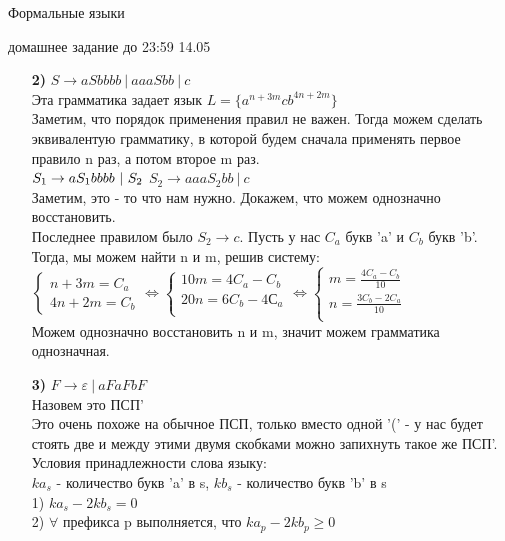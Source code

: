 \documentclass[12pt]{article}
\begin{document}
\begin{center} {\LARGE Формальные языки} \end{center}

\begin{center} \Large домашнее задание до 23:59 14.05 \end{center}
\bigskip

\begin{enumerate}
  \item[\bf 2)] $S \to aSbbbb\ |\ aaaSbb\ |\ c$\\
  Эта грамматика задает язык $L = \{a^{n + 3m}cb^{4n+2m}\}$\\
  Заметим, что порядок применения правил не важен. Тогда можем сделать эквивалентую грамматику, в которой будем сначала применять первое правило n раз, а потом второе m раз.\\
  $S_1 \to aS_1bbbb\ |\ S_2\\$
  $S_2 \to aaaS_2bb\ |\ c$\\
  Заметим, это - то что нам нужно. Докажем, что можем однозначно восстановить.\\
  Последнее правилом было $S_2 \to c$. Пусть у нас $C_a$ букв 'a' и $C_b$ букв 'b'. Тогда, мы можем найти n и m, решив систему:\\
  $\begin{cases}
  	n + 3m = C_a\\
  	4n + 2m = C_b
  \end{cases} \Leftrightarrow \begin{cases}
  10m = 4C_a - C_b\\
  20n = 6C_b - 4С_a\\
  \end{cases} \Leftrightarrow \begin{cases}
  m = \frac{4C_a - C_b}{10}\\
  n = \frac{3C_b - 2C_a}{10}\\
  \end{cases}$\\
  Можем однозначно восстановить n и m, значит можем грамматика однозначная.
  \item[\bf 3)] $F \to \varepsilon\ |\ aFaFbF$ \\
  Назовем это ПСП'\\
  Это очень похоже на обычное ПСП, только вместо одной '(' - у нас будет стоять две и между этими двумя скобками можно запихнуть такое же ПСП'.\\
  Условия принадлежности слова языку:\\
  $ka_s$ - количество букв 'a' в s, $kb_s$ - количество букв 'b' в s\\
  1) $ka_s - 2kb_s = 0$\\ 
  2) $\forall$ префикса p выполняется, что $ka_p - 2kb_p \ge 0$
  

\end{enumerate}
\end{document}
